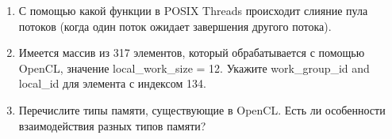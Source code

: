 \begin{enumerate}
     \item С помощью какой функции в POSIX Threads происходит слияние пула потоков (когда один поток ожидает завершения другого потока).
     
    
    \item Имеется массив из 317 элементов, который обрабатывается с помощью OpenCL, значение local\_work\_size = 12. Укажите work\_group\_id and local\_id для элемента с индексом 134.
    
    \item Перечислите типы памяти, существующие в OpenCL. Есть ли особенности взаимодействия разных типов памяти?
\end{enumerate}